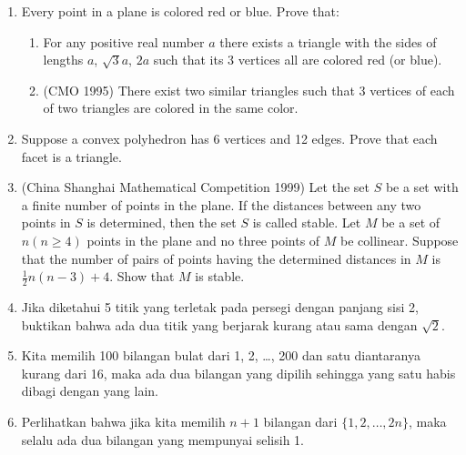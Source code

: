 \documentclass[12pt]{scrartcl}
\begin{document}
\begin{enumerate}
    \item Every point in a plane is colored red or blue. Prove that:
    \begin{enumerate}
        \item For any positive real number $a$ there exists a triangle with the sides of lengths $a$, $\sqrt{3}a$, $2a$ such that its 3 vertices all are colored red (or blue).
        \item (CMO 1995) There exist two similar triangles such that 3 vertices of each of two triangles are colored in the same color.
    \end{enumerate}
    \item Suppose a convex polyhedron has 6 vertices and 12 edges. Prove that each facet is a triangle.
    \item (China Shanghai Mathematical Competition 1999) Let the set $S$ be a set with a finite number of points in the plane. If the distances between any two points in $S$ is determined, then the set $S$ is called stable. Let $M$ be a set of $n (n \geq 4)$ points in the plane and no three points of $M$ be collinear. Suppose that the number of pairs of points having the determined distances in $M$ is $\frac{1}{2}n(n - 3) + 4$. Show that $M$ is stable.
    
    \item Jika diketahui 5 titik yang terletak pada persegi dengan panjang sisi 2, buktikan bahwa ada dua titik yang berjarak kurang atau sama dengan $\sqrt{2}$.
    
    \item Kita memilih 100 bilangan bulat dari 1, 2, \ldots, 200 dan satu diantaranya kurang dari 16, maka ada dua bilangan yang dipilih sehingga yang satu habis dibagi dengan yang lain.
    
    \item Perlihatkan bahwa jika kita memilih $n + 1$ bilangan dari $\{1, 2, \ldots, 2n\}$, maka selalu ada dua bilangan yang mempunyai selisih 1.
    

\end{enumerate}
\end{document}
